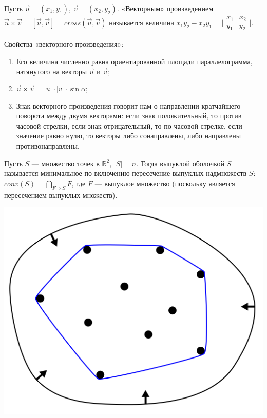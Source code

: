 \Def Пусть $\vec{u} = (x_1, y_1)$, $\vec{v} = (x_2, y_2)$. «Векторным»  произведением $\vec{u} \times \vec{v} = [\vec{u}, \vec{v}] = cross (\vec{u}, \vec{v})$ называется величина $x_1 y_2 - x_2 y_1 = \bigg| \begin{matrix} 
x_1 & x_2 \\ 
y_1 & y_2 
\end{matrix} \bigg|$.

Свойства «векторного произведения»:

\begin{enumerate}
    \item Его величина численно равна ориентированной площади параллелограмма, натянутого на векторы $\vec{u}$ и $\vec{v}$;
    \item $\vec{u} \times \vec{v} = |u| \cdot |v| \cdot \sin \alpha$;
    \item Знак векторного произведения говорит нам о направлении кратчайшего поворота между двумя векторами: если знак положительный, то против часовой стрелки, если знак отрицательный, то по часовой стрелке, если значение равно нулю, то векторы либо сонаправлены, либо направлены противонаправлены.
\end{enumerate}

\Def Пусть $S$ — множество точек в $\mathbb{R}^2$, $|S| = n$. Тогда выпуклой оболочкой $S$ называется минимальное по включению пересечение выпуклых надмножеств $S$: $conv (S) = \bigcap \limits_{F \supset S} F$, где $F$ — выпуклое множество (поскольку является пересечением выпуклых множеств).

\begin{minipage}[r]{0.15\linewidth} 
    \includegraphics[width=2\linewidth]{images/44_1.png}
\end{minipage} \\


